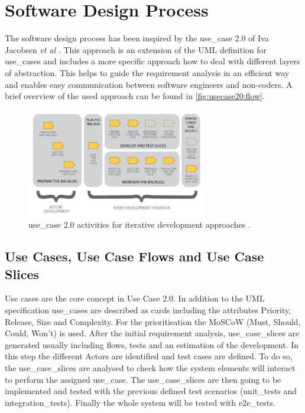 \section{Software Design Process}
\label{sec:design}

The software design process has been inspired by the \Gls{use_case} 2.0 of Iva Jacobsen \textit{et al} \cite{jacobson2011usecase}. This approach is an extension of the \gls{UML} definition for \glspl{use_case} and includes a more specific approach how to deal with different layers of abstraction. This helps to guide the requirement analysis in an efficient way and enables easy communication between software engineers and non-coders. A brief overview of the used approach can be found in \autoref{fig:usecase20:flow}.

\begin{figure}[!ht]
\centering
\includegraphics[width=0.7\textwidth]{figures/uc20_flow}
\caption{\Gls{use_case} 2.0 activities for iterative development approaches \cite{jacobson2011usecase}.}
\label{fig:usecase20:flow}
\end{figure}


\subsection{Use Cases, Use Case Flows and Use Case Slices}
Use cases are the core concept in Use Case 2.0. In addition to the \gls{UML} specification \glspl{use_case} are described as cards including the attributes Priority, Release, Size and Complexity. For the prioritisation the MoSCoW \cite{moscow} (Must, Should, Could, Won't) is used. After the initial requirement analysis, \glspl{use_case_slice} are generated usually including flows, tests and an estimation of the development. In this step the different \glspl{Actor} are identified and test cases are defined. To do so, the \glspl{use_case_slice} are analysed to check how the system elements will interact to perform the assigned \gls{use_case}. The \glspl{use_case_slice} are then going to be implemented and tested with the previous defined test scenarios (\glspl{unit_test} and \glspl{integration_test}). Finally the whole system will be tested with \glspl{e2e_test}.

